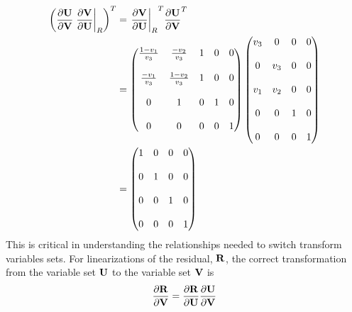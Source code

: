 \begin{equation}
  \begin{aligned}
    \left( \frac{\partial \mathbf U}{\partial \mathbf V} \left. \frac{\partial \mathbf V}{\partial \mathbf U}\right|_{R} \right)^T &= 
    {\left. \frac{\partial \mathbf V}{\partial \mathbf U}\right|_{R}}^T {\frac{\partial \mathbf U}{\partial \mathbf V}}^T \\ &=
    \begin{pmatrix}
      \frac{1-v_1}{v_3} & \frac{-v_2}{v_3}  & 1 & 0 & 0 \\ \\
      \frac{-v_1}{v_3}  & \frac{1-v_2}{v_3} & 1 & 0 & 0 \\ \\
      0                 & 1                 & 0 & 1 & 0 \\ \\
      0                 & 0                 & 0 & 0 & 1
    \end{pmatrix}
    \begin{pmatrix}
      v_3 & 0   & 0   & 0 \\ \\
      0   & v_3 & 0   & 0 \\ \\
      v_1 & v_2 & 0   & 0 \\ \\
      0   & 0   & 1   & 0 \\ \\
      0   & 0   & 0   & 1 
    \end{pmatrix} \\
    &= 
    \begin{pmatrix}
      1 & 0 & 0 & 0 \\ \\
      0 & 1 & 0 & 0 \\ \\
      0 & 0 & 1 & 0 \\ \\
      0 & 0 & 0 & 1
    \end{pmatrix}
  \end{aligned}
  \label{dvdu-jac-tranpose}
\end{equation}
This is critical in understanding the relationships needed to switch transform
variables sets.  For linearizations of the residual, $\mathbf R$, the correct
transformation from the variable set $\mathbf U$ to the variable set $\mathbf V$ is
\begin{equation}
  \frac{\partial \mathbf R}{\partial \mathbf V} = \frac{\partial \mathbf R}{\partial \mathbf U} \frac{\partial \mathbf U}{\partial \mathbf V}
  \label{r-u-to-v}
\end{equation}
